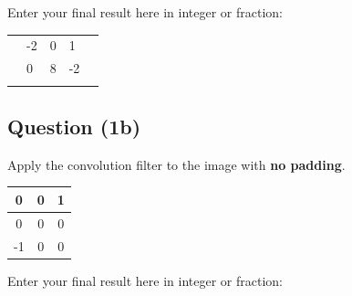 \documentclass[12pt]{article}
\begin{document}
\noindent Enter your final result here in integer or fraction:

\begin{center}
\begin{tabular}{|l|l|l|l|l|}
\hline
\hspace{1mm} & \hspace{1mm} & \hspace{1mm} & \hspace{1mm} & \hspace{1mm} \\ \hline
\hspace{1mm} & -2 \hspace{1mm} & 0 \hspace{1mm} & 1 \hspace{1mm} & \hspace{1mm} \\ \hline
\hspace{1mm} & 0 \hspace{1mm} & 8 \hspace{1mm} & -2 \hspace{1mm} & \hspace{1mm} \\ \hline
\hspace{1mm} & \hspace{1mm} & \hspace{1mm} & \hspace{1mm} & \hspace{1mm} \\ \hline
\end{tabular}
\end{center}

\subsection*{Question (1b)} Apply the convolution filter to the image with \textbf{no padding}.
\begin{center}
\begin{tabular}{|c|c|c|}
\hline
0  & 0 & 1 \\ \hline
0  & 0 & 0 \\ \hline
-1 & 0 & 0 \\ \hline
\end{tabular}
\end{center}

\noindent Enter your final result here in integer or fraction:
\end{document}
